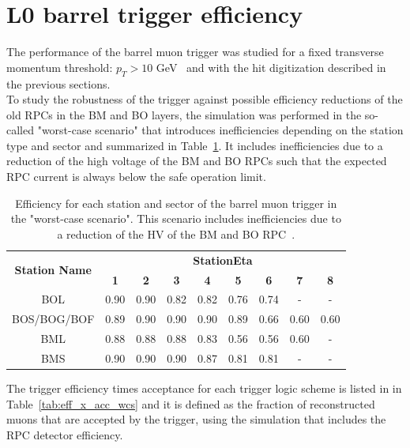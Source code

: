\section{L0 barrel trigger efficiency}
\label{sec:eff}
The performance of the barrel muon trigger was studied for a fixed transverse momentum threshold: $p_{T} > 10$ GeV~\cite{Marcoccia:2693982} and with the hit digitization described in the previous sections.\\
To study the robustness of the trigger against possible efficiency reductions of the old RPCs in the BM and BO layers, the simulation was performed in the so-called "worst-case scenario" that introduces inefficiencies depending on the station type and sector and summarized in Table~\ref{tab:WCS}. It includes inefficiencies due to a reduction of the high voltage of the BM and BO RPCs such that the expected RPC current is always below the safe operation limit.
\begin{table}[htbp]
	\begin{center}
		\begin{tabular}{c|cccccccc}
			\multirow{2}{*}{\textbf{Station Name}} & \multicolumn{8}{c}{\textbf{StationEta}}\\
			\cline{2-9}
			& \textbf{1} & \textbf{2} & \textbf{3} & \textbf{4} & \textbf{5} & \textbf{6} & \textbf{7} & \textbf{8}\\
			\hline 
			BOL                 				   & 0.90  	    & 0.90		 & 0.82 	  & 0.82 	   & 0.76 		& 0.74 		 & -	      & -    \\
			BOS/BOG/BOF 						   & 0.89 		& 0.90 		 & 0.90 	  & 0.90	   & 0.89 		& 0.66 		 & 0.60       & 0.60 \\
			BML                					   & 0.88		& 0.88 		 & 0.88 	  & 0.83 	   & 0.56 		& 0.56		 & 0.60       & -    \\
			BMS              					   & 0.90  	    & 0.90		 & 0.90 	  & 0.87 	   & 0.81 	    & 0.81    	 & -          & -    \\
			\hline 
		\end{tabular} 
		\caption{Efficiency for each station and sector of the barrel muon trigger in the "worst-case scenario". This scenario includes inefficiencies due to a reduction of the HV of the BM and BO RPC~\cite{Marcoccia:2693982}.} 
		\label{tab:WCS}
	\end{center} 
\end{table} 
\noindent The trigger efficiency times acceptance for each trigger logic scheme is listed in in Table~\ref{tab:eff_x_acc_wcs} and it is defined as the fraction of reconstructed muons that are accepted by the trigger, using the simulation that includes the RPC detector efficiency.
